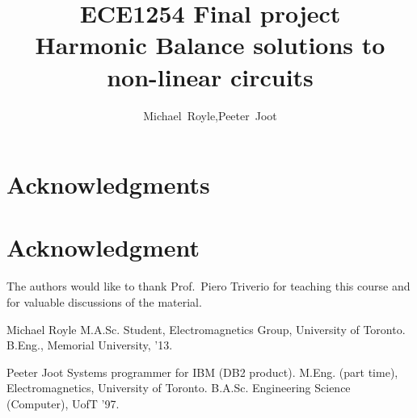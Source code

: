 \documentclass[12pt,journal,compsoc]{../ieeepaper/IEEEtran}
\begin{document}
\title{ECE1254 Final project \\ 
Harmonic Balance solutions to non-linear circuits
}

\author{Michael~Royle,Peeter~Joot}


\maketitle

\IEEEdisplaynontitleabstractindextext
\IEEEpeerreviewmaketitle





\ifCLASSOPTIONcompsoc
  \section*{Acknowledgments}
\else
  \section*{Acknowledgment}
\fi


The authors would like to thank Prof.\ Piero Triverio for teaching this course and for valuable discussions of the material.

\ifCLASSOPTIONcaptionsoff
  \newpage
\fi


\label{app:bibliography}


\begin{IEEEbiography}{Michael Royle}
M.A.Sc. Student, Electromagnetics Group, University of Toronto. B.Eng., Memorial University, '13. 
\end{IEEEbiography}

\begin{IEEEbiography}{Peeter Joot}
Systems programmer for IBM (DB2 product).  M.Eng. (part time), Electromagnetics, University of Toronto. B.A.Sc. Engineering Science (Computer), UofT '97. 
\end{IEEEbiography}
\end{document}
